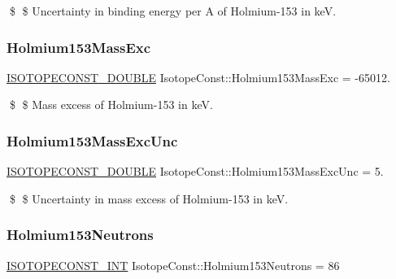 \$ \$ Uncertainty in binding energy per A of Holmium-\/153 in keV. \mbox{\label{group___isotope_const-_holmium-_ho153_gaf0d3a336f34ca26b66b147a7b818a21b}} 
\subsubsection{\texorpdfstring{Holmium153\+Mass\+Exc}{Holmium153MassExc}}
{\footnotesize\ttfamily \mbox{\hyperlink{group___isotope_const-_macros_ga8f45a7272ce02c0b4c65c44636ed719a}{I\+S\+O\+T\+O\+P\+E\+C\+O\+N\+S\+T\+\_\+\+D\+O\+U\+B\+LE}} Isotope\+Const\+::\+Holmium153\+Mass\+Exc = -\/65012.}

\$ \$ Mass excess of Holmium-\/153 in keV. \mbox{\label{group___isotope_const-_holmium-_ho153_gacecea587dadcd83c8ccc2d83d629ff38}} 
\subsubsection{\texorpdfstring{Holmium153\+Mass\+Exc\+Unc}{Holmium153MassExcUnc}}
{\footnotesize\ttfamily \mbox{\hyperlink{group___isotope_const-_macros_ga8f45a7272ce02c0b4c65c44636ed719a}{I\+S\+O\+T\+O\+P\+E\+C\+O\+N\+S\+T\+\_\+\+D\+O\+U\+B\+LE}} Isotope\+Const\+::\+Holmium153\+Mass\+Exc\+Unc = 5.}

\$ \$ Uncertainty in mass excess of Holmium-\/153 in keV. \mbox{\label{group___isotope_const-_holmium-_ho153_gae8bf3b3fd39c0fbdbe924a8b9b5a377e}} 
\subsubsection{\texorpdfstring{Holmium153\+Neutrons}{Holmium153Neutrons}}
{\footnotesize\ttfamily \mbox{\hyperlink{group___isotope_const-_macros_ga5f18360b3e99483a35c32d789e62621c}{I\+S\+O\+T\+O\+P\+E\+C\+O\+N\+S\+T\+\_\+\+I\+NT}} Isotope\+Const\+::\+Holmium153\+Neutrons = 86}

